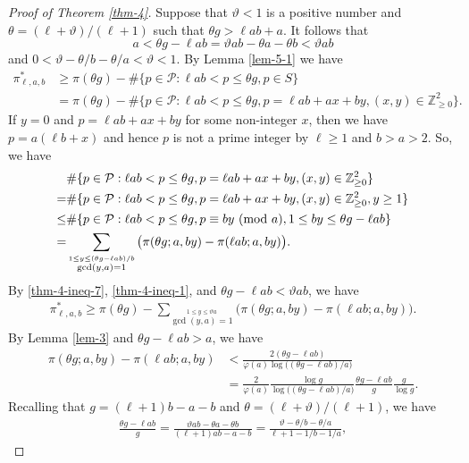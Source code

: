 \documentclass[12pt,a4paper,reqno]{amsart}
\numberwithin{equation}{section}
\def\Z{{\mathbb Z}}
\def\pmod #1{\ ({\rm{mod}}\ #1)}
\def\cP{{\mathcal P}}
\theoremstyle{plain}
\theoremstyle{definition}
\begin{document}
\begin{proof}[Proof of Theorem \ref{thm-4}]
Suppose that $\vartheta<1$ is a positive number and $\theta=(\ell+\vartheta)/(\ell+1)$ such that $\theta g>\ell ab+a$. It follows that 
$$ 
a<\theta g-\ell ab = \vartheta ab -\theta a-\theta b<\vartheta ab
$$ 
and $0<\vartheta -\theta/b-\theta/a<\vartheta<1$.
By Lemma \ref{lem-5-1} we have
\begin{align}\label{thm-4-ineq-7}
	\pi^{*}_{\ell,a,b} 
	&\geq \pi(\theta g)- \#\{p\in\cP: \ell ab < p \leq \theta g, p\in S\}\nonumber\\
	&= \pi(\theta g)-\#\{p\in\cP: \ell ab<p\leq \theta g, p=\ell ab+ax+by,(x,y)\in\Z_{\geq 0}^{2}\}.
\end{align}
If $y=0$ and $p=\ell ab+ax+by$ for some non-integer $x$, then we have $p=a(\ell b+x)$ and hence $p$ is not a prime integer by $\ell\geq 1$ and $b>a>2$. 
So, we have
\begin{align}\label{thm-4-ineq-1}
	&\#\{p\in\cP: \ell ab<p\leq \theta g, p=\ell ab+ax+by,(x,y)\in\Z_{\geq 0}^{2}\}\nonumber\\
	= &\#\{p\in\cP: \ell ab<p\leq \theta g, p=\ell ab+ax+by,(x,y)\in\Z_{\geq 0}^{2}, y\geq 1\}\nonumber\\
	\leq &\#\{p\in\cP: \ell ab<p\leq \theta g, p\equiv by \pmod{a},1\leq by\leq \theta g-\ell ab\}\nonumber\\
	=  &\sum_{\stackrel{1\leq y\leq (\theta g-\ell ab)/b}{\gcd(y,a)=1}}\big( \pi(\theta g;a,by)- \pi(\ell ab;a,by)\big).
\end{align}
By \eqref{thm-4-ineq-7}, \eqref{thm-4-ineq-1}, and $\theta g-\ell ab<\vartheta ab$, we have
\begin{align}\label{thm-4-ineq-3}
		\pi^{*}_{\ell,a,b} \geq \pi(\theta g)-\sum_{\stackrel{1\leq y\leq \vartheta a}{\gcd(y,a)=1}} \big( \pi(\theta g;a,by)- \pi(\ell ab;a,by)\big).
\end{align}
By Lemma \ref{lem-3} and $\theta g-\ell ab>a$, we have
\begin{align}\label{thm-4-ineq-4}
	\pi(\theta g;a,by)- \pi(\ell ab;a,by) 
	&< \frac{2(\theta g-\ell ab)}{\varphi(a)\log \big( (\theta g-\ell ab)/a \big)}\nonumber\\
	&=\frac{2}{\varphi(a)} \frac{\log  g}{\log\big((\theta g-\ell ab)/a \big)} \frac{\theta g-\ell ab}{g} \frac{g}{\log  g}.
\end{align} Recalling that $g=(\ell+1)b-a-b$ and $\theta= (\ell+\vartheta)/(\ell+1)$, we have
\begin{align}\label{thm-4-ineq-5}
	\frac{\theta g-\ell ab}{g}=\frac{\vartheta ab-\theta a-\theta b}{(\ell+1)ab-a-b}=\frac{\vartheta-\theta/b-\theta/a}{\ell+1-1/b-1/a}, 

\end{align}
\end{proof}
\end{document}
